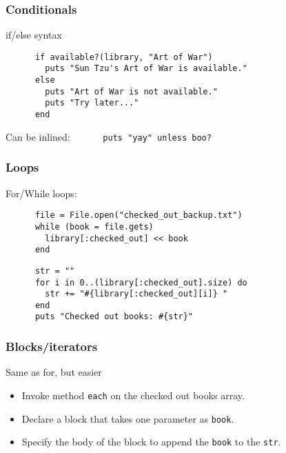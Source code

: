 \documentclass{beamer}
\begin{document}
\begin{frame}[fragile]
  \frametitle{Conditionals}
  \begin{block}{if/else syntax}
    \begin{verbatim}
      if available?(library, "Art of War")
        puts "Sun Tzu's Art of War is available."
      else
        puts "Art of War is not available."
        puts "Try later..."
      end
    \end{verbatim}
    \begin{block}{Can be inlined:}
      \verb|      puts "yay" unless boo?|
    \end{block}
  \end{block}
\end{frame}

\begin{frame}[fragile]
  \frametitle{Loops}

  \begin{block}{For/While loops:}
    \begin{verbatim}
      file = File.open("checked_out_backup.txt")
      while (book = file.gets)
        library[:checked_out] << book
      end
    \end{verbatim}
    \begin{verbatim}
      str = ""
      for i in 0..(library[:checked_out].size) do
        str += "#{library[:checked_out][i]} "
      end
      puts "Checked out books: #{str}"
    \end{verbatim}
  \end{block}
\end{frame}

\begin{frame}[t,fragile]
  \frametitle{Blocks/iterators}
  \begin{block}{Same as for, but easier}
    \begin{semiverbatim}
    \end{semiverbatim}
  \end{block}

  \begin{itemize}
    \item<2> Invoke method \texttt{each} on the checked out books array.
    \item<3> Declare a block that takes one parameter as \texttt{book}.
    \item<4> Specify the body of the block to append the \texttt{book} to the \texttt{str}.
  \end{itemize}
\end{frame}
\end{document}
